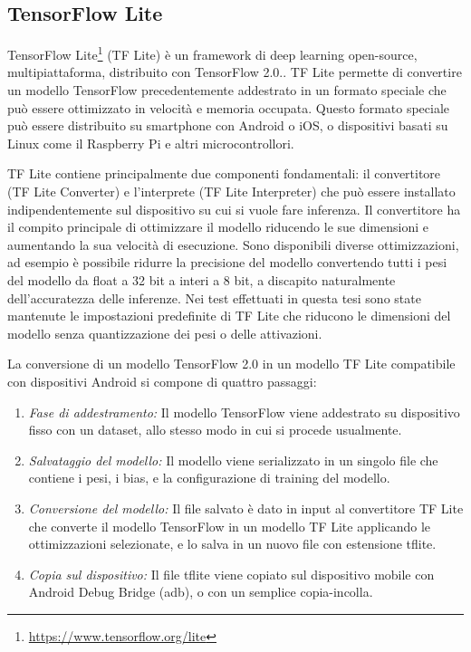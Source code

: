 \documentclass[12pt,italian]{report}
\begin{document}
\subsection{TensorFlow Lite}
TensorFlow Lite\footnote{\url{https://www.tensorflow.org/lite}} (TF Lite) è un framework di deep learning open-source, multipiattaforma, distribuito con TensorFlow 2.0.. TF Lite permette di convertire un modello TensorFlow precedentemente addestrato in un formato speciale che può essere ottimizzato in velocità e memoria occupata. Questo formato speciale può essere distribuito su smartphone con Android o iOS, o dispositivi basati su Linux come il Raspberry Pi e altri microcontrollori.

TF Lite contiene principalmente due componenti fondamentali:  il convertitore (TF Lite Converter) e l’interprete (TF Lite Interpreter) che può essere installato indipendentemente sul dispositivo su cui si vuole fare inferenza.  Il convertitore ha il compito principale di ottimizzare il modello riducendo le sue dimensioni e aumentando la sua velocità di esecuzione. Sono disponibili diverse ottimizzazioni, ad esempio è possibile ridurre la precisione del modello convertendo tutti i pesi del modello da float a 32 bit a interi a 8 bit, a discapito naturalmente dell'accuratezza delle inferenze. Nei test effettuati in questa tesi sono state mantenute le impostazioni predefinite di TF Lite che riducono le dimensioni del modello senza quantizzazione dei pesi o delle attivazioni.

La conversione di un modello TensorFlow 2.0 in un modello TF Lite compatibile con dispositivi Android si compone di quattro passaggi:
\begin{enumerate}
\item \textit{Fase di addestramento:} Il modello TensorFlow viene addestrato su dispositivo fisso con un dataset, allo stesso modo in cui si procede usualmente.

\item \textit{Salvataggio del modello:} Il modello viene serializzato in un singolo file che contiene i pesi, i bias, e la configurazione di training del modello.

\item \textit{Conversione del modello:} Il file salvato è dato in input al convertitore TF Lite che converte il modello TensorFlow in un modello TF Lite applicando le ottimizzazioni selezionate, e lo salva in un nuovo file con estensione tflite.

\item \textit{Copia sul dispositivo:} Il file tflite viene copiato sul dispositivo mobile con  Android Debug Bridge (adb), o con un semplice copia-incolla.
\end{enumerate}
\end{document}
